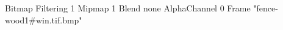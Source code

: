 {Bitmap
	{Filtering 1}
	{Mipmap 1}
	{Blend none}
	{AlphaChannel 0}
	{Frame "fence-wood1#win.tif.bmp"}
}
